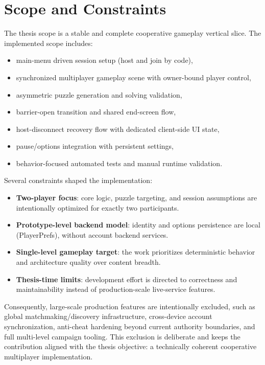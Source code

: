 \section{Scope and Constraints}
The thesis scope is a stable and complete cooperative gameplay vertical slice. The implemented scope includes:
\begin{itemize}
\item main-menu driven session setup (host and join by code),
\item synchronized multiplayer gameplay scene with owner-bound player control,
\item asymmetric puzzle generation and solving validation,
\item barrier-open transition and shared end-screen flow,
\item host-disconnect recovery flow with dedicated client-side UI state,
\item pause/options integration with persistent settings,
\item behavior-focused automated tests and manual runtime validation.
\end{itemize}

Several constraints shaped the implementation:
\begin{itemize}
\item \textbf{Two-player focus}: core logic, puzzle targeting, and session assumptions are intentionally optimized for exactly two participants.
\item \textbf{Prototype-level backend model}: identity and options persistence are local (PlayerPrefs), without account backend services.
\item \textbf{Single-level gameplay target}: the work prioritizes deterministic behavior and architecture quality over content breadth.
\item \textbf{Thesis-time limits}: development effort is directed to correctness and maintainability instead of production-scale live-service features.
\end{itemize}

\newpage

Consequently, large-scale production features are intentionally excluded, such as global matchmaking/discovery infrastructure, cross-device account synchronization, anti-cheat hardening beyond current authority boundaries, and full multi-level campaign tooling. This exclusion is deliberate and keeps the contribution aligned with the thesis objective: a technically coherent cooperative multiplayer implementation.

